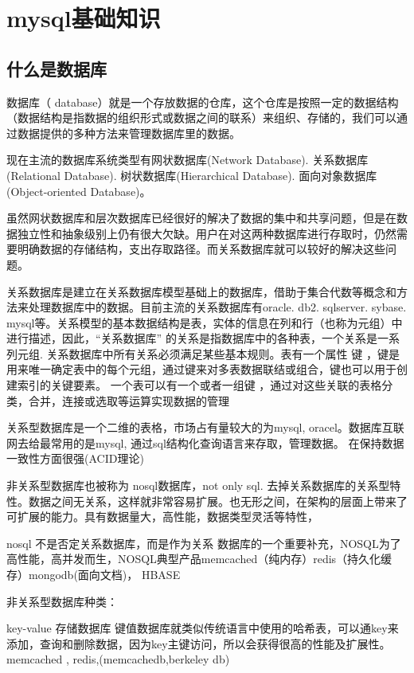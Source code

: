 \chapter{mysql基础知识}

\section{什么是数据库}
数据库（ database）就是一个存放数据的仓库，这个仓库是按照一定的数据结构（数据结构是指数据的组织形式或数据之间的联系）来组织、存储的，我们可以通过数据提供的多种方法来管理数据库里的数据。

现在主流的数据库系统类型有网状数据库(Network Database). 关系数据库(Relational Database). 树状数据库(Hierarchical Database). 面向对象数据库(Object-oriented Database)。

虽然网状数据库和层次数据库已经很好的解决了数据的集中和共享问题，但是在数据独立性和抽象级别上仍有很大欠缺。用户在对这两种数据库进行存取时，仍然需要明确数据的存储结构，支出存取路径。而关系数据库就可以较好的解决这些问题。

关系数据库是建立在关系数据库模型基础上的数据库，借助于集合代数等概念和方法来处理数据库中的数据。目前主流的关系数据库有oracle. db2. sqlserver. sybase. mysql等。关系模型的基本数据结构是表，实体的信息在列和行（也称为元组）中进行描述，因此，“关系数据库” 的关系是指数据库中的各种表，一个关系是一系列元组. 关系数据库中所有关系必须满足某些基本规则。表有一个属性 键 ，键是用来唯一确定表中的每个元组，通过键来对多表数据联结或组合，键也可以用于创建索引的关键要素。 一个表可以有一个或者一组键 ，通过对这些关联的表格分类，合并，连接或选取等运算实现数据的管理 

关系型数据库是一个二维的表格，市场占有量较大的为mysql, oracel。数据库互联网去给最常用的是mysql, 通过sql结构化查询语言来存取，管理数据。 在保持数据一致性方面很强(ACID理论)

非关系型数据库也被称为 nosql数据库，not only sql. 去掉关系数据库的关系型特性。数据之间无关系，这样就非常容易扩展。也无形之间，在架构的层面上带来了可扩展的能力。具有数据量大，高性能，数据类型灵活等特性，

nosql 不是否定关系数据库，而是作为关系 数据库的一个重要补充，NOSQL为了高性能，高并发而生，NOSQL典型产品memcached（纯内存）redis（持久化缓存）mongodb(面向文档)， HBASE

非关系型数据库种类：

key-value 存储数据库 键值数据库就类似传统语言中使用的哈希表，可以通key来添加，查询和删除数据，因为key主键访问，所以会获得很高的性能及扩展性。memcached , redis,(memcachedb,berkeley db)

